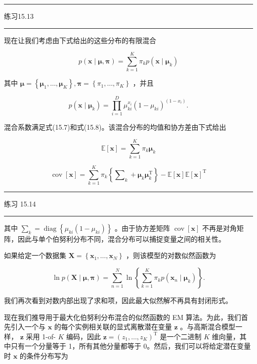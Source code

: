 \documentclass[10pt]{report}
\newcommand{\HRule}{\begin{center}\rule{0.9\linewidth}{0.2mm}\end{center}}
\begin{document}
\HRule

练习15.13

\HRule

现在让我们考虑由下式给出的这些分布的有限混合

\[
p\left( {\mathbf{x} \mid  \mathbf{\mu },\mathbf{\pi }}\right)  = \mathop{\sum }\limits_{{k = 1}}^{K}{\pi }_{k}p\left( {\mathbf{x} \mid  {\mathbf{\mu }}_{k}}\right)  \tag{15.37}
\]

其中 \(\mathbf{\mu } = \left\{  {{\mathbf{\mu }}_{1},\ldots ,{\mathbf{\mu }}_{K}}\right\}  ,\mathbf{\pi } = \left\{  {{\pi }_{1},\ldots ,{\pi }_{K}}\right\}\) ，并且

\[
p\left( {\mathbf{x} \mid  {\mathbf{\mu }}_{k}}\right)  = \mathop{\prod }\limits_{{i = 1}}^{D}{\mu }_{ki}^{{x}_{i}}{\left( 1 - {\mu }_{ki}\right) }^{\left( 1 - {x}_{i}\right) }. \tag{15.38}
\]

混合系数满足式(15.7)和式(15.8)。该混合分布的均值和协方差由下式给出

\[
\mathbb{E}\left\lbrack  \mathbf{x}\right\rbrack   = \mathop{\sum }\limits_{{k = 1}}^{K}{\pi }_{k}{\mathbf{\mu }}_{k} \tag{15.39}
\]

\[
\operatorname{cov}\left\lbrack  \mathbf{x}\right\rbrack   = \mathop{\sum }\limits_{{k = 1}}^{K}{\pi }_{k}\left\{  {{\mathbf{\sum }}_{k} + {\mathbf{\mu }}_{k}{\mathbf{\mu }}_{k}^{\mathrm{T}}}\right\}   - \mathbb{E}\left\lbrack  \mathbf{x}\right\rbrack  \mathbb{E}{\left\lbrack  \mathbf{x}\right\rbrack  }^{\mathrm{T}} \tag{15.40}
\]

\HRule

练习 15.14

\HRule

其中 \({\mathbf{\sum }}_{k} = \operatorname{diag}\left\{  {{\mu }_{ki}\left( {1 - {\mu }_{ki}}\right) }\right\}\) 。由于协方差矩阵 \(\operatorname{cov}\left\lbrack  \mathbf{x}\right\rbrack\) 不再是对角矩阵，因此与单个伯努利分布不同，混合分布可以捕捉变量之间的相关性。

如果给定一个数据集 \(\mathbf{X} = \left\{  {{\mathbf{x}}_{1},\ldots ,{\mathbf{x}}_{N}}\right\}\) ，则该模型的对数似然函数为

\[
\ln p\left( {\mathbf{X} \mid  \mathbf{\mu },\mathbf{\pi }}\right)  = \mathop{\sum }\limits_{{n = 1}}^{N}\ln \left\{  {\mathop{\sum }\limits_{{k = 1}}^{K}{\pi }_{k}p\left( {{\mathbf{x}}_{n} \mid  {\mathbf{\mu }}_{k}}\right) }\right\}  . \tag{15.41}
\]

我们再次看到对数内部出现了求和项，因此最大似然解不再具有封闭形式。

现在我们推导用于最大化伯努利分布混合的似然函数的 EM 算法。为此，我们首先引入一个与 \(\mathbf{x}\) 的每个实例相关联的显式离散潜在变量 \(\mathbf{z}\) 。与高斯混合模型一样， \(\mathbf{z}\) 采用 1-of- \(K\) 编码，因此 \(\mathbf{z} = {\left( {z}_{1},\ldots ,{z}_{K}\right) }^{\mathrm{T}}\) 是一个二进制 \(K\) 维向量，其中只有一个分量等于 1，所有其他分量都等于 0。然后，我们可以将给定潜在变量时 \(\mathbf{x}\) 的条件分布写为
\end{document}
